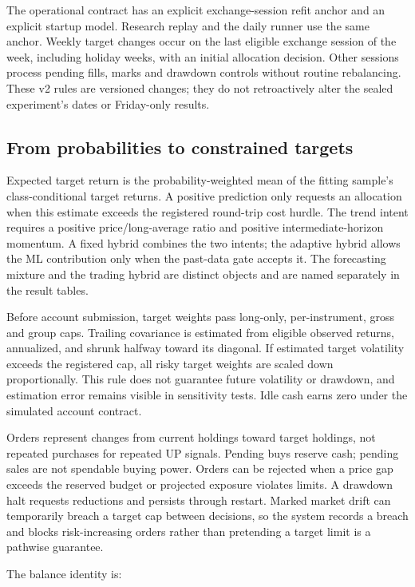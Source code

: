 \documentclass[11pt,a4paper]{article}
\begin{document}
The operational contract has an explicit exchange-session refit anchor and an explicit startup model. Research replay and the daily runner use the same anchor. Weekly target changes occur on the last eligible exchange session of the week, including holiday weeks, with an initial allocation decision. Other sessions process pending fills, marks and drawdown controls without routine rebalancing. These v2 rules are versioned changes; they do not retroactively alter the sealed experiment's dates or Friday-only results.

\subsection{From probabilities to constrained targets}

Expected target return is the probability-weighted mean of the fitting sample's class-conditional target returns. A positive prediction only requests an allocation when this estimate exceeds the registered round-trip cost hurdle. The trend intent requires a positive price/long-average ratio and positive intermediate-horizon momentum. A fixed hybrid combines the two intents; the adaptive hybrid allows the ML contribution only when the past-data gate accepts it. The forecasting mixture and the trading hybrid are distinct objects and are named separately in the result tables.

Before account submission, target weights pass long-only, per-instrument, gross and group caps. Trailing covariance is estimated from eligible observed returns, annualized, and shrunk halfway toward its diagonal. If estimated target volatility exceeds the registered cap, all risky target weights are scaled down proportionally. This rule does not guarantee future volatility or drawdown, and estimation error remains visible in sensitivity tests. Idle cash earns zero under the simulated account contract.

Orders represent changes from current holdings toward target holdings, not repeated purchases for repeated UP signals. Pending buys reserve cash; pending sales are not spendable buying power. Orders can be rejected when a price gap exceeds the reserved budget or projected exposure violates limits. A drawdown halt requests reductions and persists through restart. Marked market drift can temporarily breach a target cap between decisions, so the system records a breach and blocks risk-increasing orders rather than pretending a target limit is a pathwise guarantee.

The balance identity is:
\end{document}
